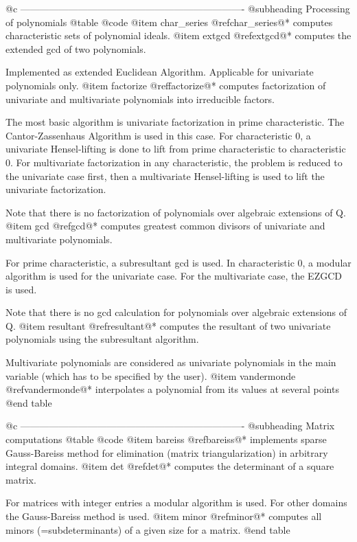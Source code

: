 @c ----------------------------------------------------------------------
@subheading Processing of polynomials
@table @code
@item char_series
@ref{char_series}@*
computes characteristic sets of polynomial ideals.
@item extgcd
@ref{extgcd}@*
computes the extended gcd of two polynomials.

Implemented as extended Euclidean Algorithm.  Applicable for univariate
polynomials only.
@item factorize
@ref{factorize}@*
computes factorization of univariate and multivariate polynomials into
irreducible factors.

The most basic algorithm is univariate factorization in prime
characteristic.  The Cantor-Zassenhaus Algorithm is used in this case.
For characteristic 0, a univariate Hensel-lifting is done to lift from
prime characteristic to characteristic 0.  For multivariate
factorization in any characteristic, the problem is reduced to the
univariate case first, then a multivariate Hensel-lifting is used to
lift the univariate factorization.

Note that there is no factorization of polynomials over algebraic
extensions of Q.
@item gcd
@ref{gcd}@*
computes greatest common divisors of univariate and multivariate polynomials.

For prime characteristic, a subresultant gcd is used.  In characteristic 0, a
modular algorithm is used for the univariate case.  For the multivariate case,
the EZGCD is used.

Note that there is no gcd calculation for polynomials over algebraic
extensions of Q.
@item resultant
@ref{resultant}@*
computes the resultant of two univariate polynomials using the subresultant
algorithm.

Multivariate polynomials are considered as univariate polynomials in the
main variable (which has to be specified by the user).
@item vandermonde
@ref{vandermonde}@*
interpolates a polynomial from its values at several points
@end table

@c ----------------------------------------------------------------------
@subheading Matrix computations
@table @code
@item bareiss
@ref{bareiss}@*
implements sparse Gauss-Bareiss method for elimination (matrix
triangularization) in arbitrary integral domains.
@item det
@ref{det}@*
computes the determinant of a square matrix.

For matrices with integer entries a modular algorithm is used.  For
other domains the Gauss-Bareiss method is used.
@item minor
@ref{minor}@*
computes all minors (=subdeterminants) of a given size for a matrix.
@end table

